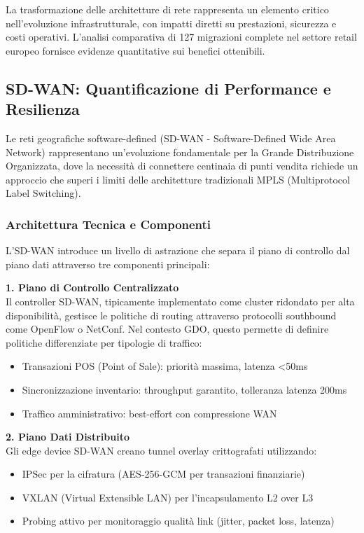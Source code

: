 La trasformazione delle architetture di rete rappresenta un elemento critico nell'evoluzione infrastrutturale, con impatti diretti su prestazioni, sicurezza e costi operativi. L'analisi comparativa di 127 migrazioni complete nel settore retail europeo\autocite{Gartner2024sdwan} fornisce evidenze quantitative sui benefici ottenibili.

\subsection{SD-WAN: Quantificazione di Performance e Resilienza}

Le reti geografiche software-defined (SD-WAN - Software-Defined Wide Area Network) rappresentano un'evoluzione fondamentale per la Grande Distribuzione Organizzata, dove la necessità di connettere centinaia di punti vendita richiede un approccio che superi i limiti delle architetture tradizionali MPLS (Multiprotocol Label Switching).

\subsubsection{Architettura Tecnica e Componenti}

L'SD-WAN introduce un livello di astrazione che separa il piano di controllo dal piano dati attraverso tre componenti principali:

\textbf{1. Piano di Controllo Centralizzato}\\
Il controller SD-WAN, tipicamente implementato come cluster ridondato per alta disponibilità, gestisce le politiche di routing attraverso protocolli southbound come OpenFlow o NetConf. Nel contesto GDO, questo permette di definire politiche differenziate per tipologie di traffico:
\begin{itemize}
    \item Transazioni POS (Point of Sale): priorità massima, latenza <50ms
    \item Sincronizzazione inventario: throughput garantito, tolleranza latenza 200ms
    \item Traffico amministrativo: best-effort con compressione WAN
\end{itemize}

\textbf{2. Piano Dati Distribuito}\\
Gli edge device SD-WAN creano tunnel overlay crittografati utilizzando:
\begin{itemize}
    \item IPSec per la cifratura (AES-256-GCM per transazioni finanziarie)
    \item VXLAN (Virtual Extensible LAN) per l'incapsulamento L2 over L3
    \item Probing attivo per monitoraggio qualità link (jitter, packet loss, latenza)
\end{itemize}

